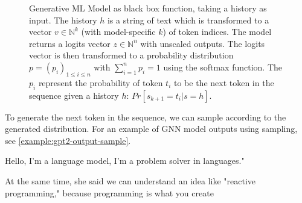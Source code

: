 \begin{figure}[htpb]
	\centering
	\caption{
Generative ML Model as black box function, taking a history as input.
The history $h$ is a string of text which is transformed to a vector $v \in \mathbb{N}^k$ (with model-specific $k$) of token indices.
The model returns a logits vector $z \in \mathbb{N}^n$ with unscaled outputs.
The logits vector is then transformed to a probability distribution $p = \left(p_i\right)_{1 \leq i \leq n}$ with $\sum_{i=1}^n p_i = 1$ using the softmax function.
	The $p_i$ represent the probability of token $t_i$ to be the next token in the sequence given a history $h$: $Pr[s_{k+1}=t_i|s=h]$.
}
	\label{fig:generative-network}
\end{figure}
To generate the next token in the sequence, we can sample according to the generated distribution.
For an example of GNN model outputs using sampling, see \ref{example:gpt2-output-sample}.

\begin{example}
	Hello, I'm a language model, I'm a problem solver in languages."

	At the same time, she said we can understand an idea like "reactive programming," because programming is what you create
	\label{example:gpt2-output-sample}
\end{example}

